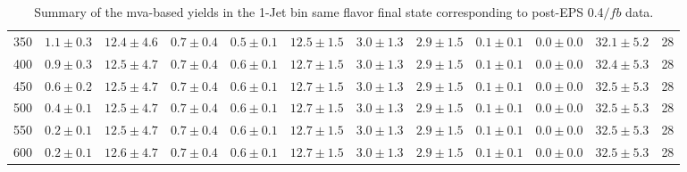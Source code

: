 \begin{table}
{\begin{center}
\begin{tabular}{l c c c c c c c c c c c }
350 & $1.1\pm0.3$ & $12.4\pm4.6$ & $0.7\pm0.4$ & $0.5\pm0.1$ & $12.5\pm1.5$ & $3.0\pm1.3$ & $2.9\pm1.5$ & $0.1\pm0.1$ & $0.0\pm0.0$ & $32.1\pm5.2$ & 28 \\
400 & $0.9\pm0.3$ & $12.5\pm4.7$ & $0.7\pm0.4$ & $0.6\pm0.1$ & $12.7\pm1.5$ & $3.0\pm1.3$ & $2.9\pm1.5$ & $0.1\pm0.1$ & $0.0\pm0.0$ & $32.4\pm5.3$ & 28 \\
450 & $0.6\pm0.2$ & $12.5\pm4.7$ & $0.7\pm0.4$ & $0.6\pm0.1$ & $12.7\pm1.5$ & $3.0\pm1.3$ & $2.9\pm1.5$ & $0.1\pm0.1$ & $0.0\pm0.0$ & $32.5\pm5.3$ & 28 \\
500 & $0.4\pm0.1$ & $12.5\pm4.7$ & $0.7\pm0.4$ & $0.6\pm0.1$ & $12.7\pm1.5$ & $3.0\pm1.3$ & $2.9\pm1.5$ & $0.1\pm0.1$ & $0.0\pm0.0$ & $32.5\pm5.3$ & 28 \\
550 & $0.2\pm0.1$ & $12.5\pm4.7$ & $0.7\pm0.4$ & $0.6\pm0.1$ & $12.7\pm1.5$ & $3.0\pm1.3$ & $2.9\pm1.5$ & $0.1\pm0.1$ & $0.0\pm0.0$ & $32.5\pm5.3$ & 28 \\
600 & $0.2\pm0.1$ & $12.6\pm4.7$ & $0.7\pm0.4$ & $0.6\pm0.1$ & $12.7\pm1.5$ & $3.0\pm1.3$ & $2.9\pm1.5$ & $0.1\pm0.1$ & $0.0\pm0.0$ & $32.5\pm5.3$ & 28 \\
\hline
\end{tabular}
\end{center}
}
\caption{Summary of the mva-based yields in the 1-Jet bin same flavor final state corresponding to post-EPS 0.4$/fb$ data.}
\end{table}
